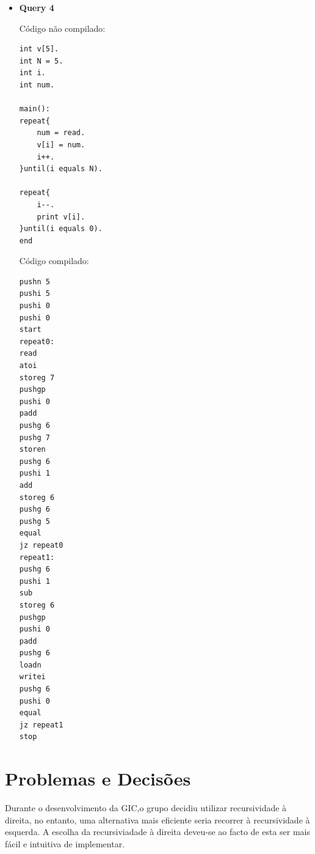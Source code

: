 \documentclass[11pt,a4paper]{report}
\begin{document}
\begin{itemize}
\begin{verbatim}
main():
    print "Indique o nº de números a ler:\n".
    N = read.

    repeat{
        print "Indique um número:\n".
        num = read.
        if(res equals 0){
            res = res + num.
        }
        else {
            res = res * num.
        }.
        i++.
    }until(i moreEq N).

    print res.
end

\end{verbatim}
Código compilado:
\begin{verbatim}
pushi 0
pushi 0
pushi 0
pushi 0
start
pushs "Indique o nº de números a ler:\n"
writes
read
atoi
storeg 0
repeat0:
pushs "Indique um número:\n"
writes
read
atoi
storeg 2
pushg 3
pushi 0
equal
jz if0
pushg 3
pushg 2
add
storeg 3
jump ifend0
if0:
pushg 3
pushg 2
mul
storeg 3
ifend0:
pushg 1
pushi 1
add
storeg 1
pushg 1
pushg 0
supeq
jz repeat0
pushg 3
writei
stop
\end{verbatim}
\item \textbf{Query 4}\par
Código não compilado:
\begin{verbatim}
int v[5].
int N = 5.
int i.
int num.

main():
repeat{
    num = read.
    v[i] = num.
    i++.
}until(i equals N).

repeat{
    i--.
    print v[i].
}until(i equals 0).
end

\end{verbatim}
Código compilado:
\begin{verbatim}
pushn 5
pushi 5
pushi 0
pushi 0
start
repeat0:
read
atoi
storeg 7
pushgp
pushi 0
padd
pushg 6
pushg 7
storen
pushg 6
pushi 1
add
storeg 6
pushg 6
pushg 5
equal
jz repeat0
repeat1:
pushg 6
pushi 1
sub
storeg 6
pushgp
pushi 0
padd
pushg 6
loadn
writei
pushg 6
pushi 0
equal
jz repeat1
stop
\end{verbatim}

\end{itemize}
\newpage

\section{Problemas e Decisões}
Durante o desenvolvimento da GIC,o grupo decidiu utilizar recursividade à direita, no entanto, uma alternativa mais eficiente seria recorrer à recursividade à esquerda. A escolha da recursiviadade à direita deveu-se ao facto de esta ser mais fácil e intuitiva de implementar.
\vspace{3ex}
	  
\end{document}
